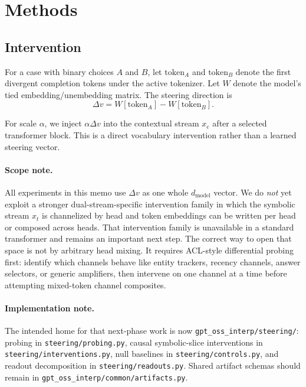 \documentclass[11pt]{article}
\begin{document}
\section{Methods}

\subsection{Intervention}

For a case with binary choices $A$ and $B$, let $\text{token}_A$ and
$\text{token}_B$ denote the first divergent completion tokens under the active
tokenizer. Let $W$ denote the model's tied embedding/unembedding matrix. The
steering direction is
\[
\Delta v = W[\text{token}_A] - W[\text{token}_B].
\]

For scale $\alpha$, we inject $\alpha \Delta v$ into the contextual stream
$x_e$ after a selected transformer block. This is a direct vocabulary
intervention rather than a learned steering vector.

\paragraph{Scope note.}
All experiments in this memo use $\Delta v$ as one whole $d_{\mathrm{model}}$
vector. We do \emph{not} yet exploit a stronger dual-stream-specific
intervention family in which the symbolic stream $x_t$ is channelized by head
and token embeddings can be written per head or composed across heads. That
intervention family is unavailable in a standard transformer and remains an
important next step. The correct way to open that space is not by arbitrary
head mixing. It requires ACL-style differential probing first: identify which
channels behave like entity trackers, recency channels, answer selectors, or
generic amplifiers, then intervene on one channel at a time before attempting
mixed-token channel composites.

\paragraph{Implementation note.}
The intended home for that next-phase work is now
\texttt{gpt\_oss\_interp/steering/}: probing in
\texttt{steering/probing.py}, causal symbolic-slice interventions in
\texttt{steering/interventions.py}, null baselines in
\texttt{steering/controls.py}, and readout decomposition in
\texttt{steering/readouts.py}. Shared artifact schemas should remain in
\texttt{gpt\_oss\_interp/common/artifacts.py}.
\end{document}
